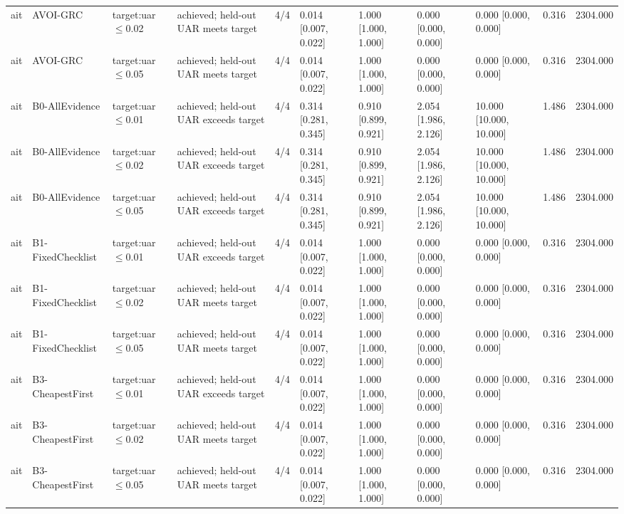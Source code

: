 \begin{table}[!ht]
{\begin{tabular}{lllllllllll}
ait & AVOI-GRC & target:uar$\le$0.02 & achieved; held-out UAR meets target & 4/4 & 0.014 [0.007, 0.022] & 1.000 [1.000, 1.000] & 0.000 [0.000, 0.000] & 0.000 [0.000, 0.000] & 0.316 & 2304.000 \\
ait & AVOI-GRC & target:uar$\le$0.05 & achieved; held-out UAR meets target & 4/4 & 0.014 [0.007, 0.022] & 1.000 [1.000, 1.000] & 0.000 [0.000, 0.000] & 0.000 [0.000, 0.000] & 0.316 & 2304.000 \\
ait & B0-AllEvidence & target:uar$\le$0.01 & achieved; held-out UAR exceeds target & 4/4 & 0.314 [0.281, 0.345] & 0.910 [0.899, 0.921] & 2.054 [1.986, 2.126] & 10.000 [10.000, 10.000] & 1.486 & 2304.000 \\
ait & B0-AllEvidence & target:uar$\le$0.02 & achieved; held-out UAR exceeds target & 4/4 & 0.314 [0.281, 0.345] & 0.910 [0.899, 0.921] & 2.054 [1.986, 2.126] & 10.000 [10.000, 10.000] & 1.486 & 2304.000 \\
ait & B0-AllEvidence & target:uar$\le$0.05 & achieved; held-out UAR exceeds target & 4/4 & 0.314 [0.281, 0.345] & 0.910 [0.899, 0.921] & 2.054 [1.986, 2.126] & 10.000 [10.000, 10.000] & 1.486 & 2304.000 \\
ait & B1-FixedChecklist & target:uar$\le$0.01 & achieved; held-out UAR exceeds target & 4/4 & 0.014 [0.007, 0.022] & 1.000 [1.000, 1.000] & 0.000 [0.000, 0.000] & 0.000 [0.000, 0.000] & 0.316 & 2304.000 \\
ait & B1-FixedChecklist & target:uar$\le$0.02 & achieved; held-out UAR meets target & 4/4 & 0.014 [0.007, 0.022] & 1.000 [1.000, 1.000] & 0.000 [0.000, 0.000] & 0.000 [0.000, 0.000] & 0.316 & 2304.000 \\
ait & B1-FixedChecklist & target:uar$\le$0.05 & achieved; held-out UAR meets target & 4/4 & 0.014 [0.007, 0.022] & 1.000 [1.000, 1.000] & 0.000 [0.000, 0.000] & 0.000 [0.000, 0.000] & 0.316 & 2304.000 \\
ait & B3-CheapestFirst & target:uar$\le$0.01 & achieved; held-out UAR exceeds target & 4/4 & 0.014 [0.007, 0.022] & 1.000 [1.000, 1.000] & 0.000 [0.000, 0.000] & 0.000 [0.000, 0.000] & 0.316 & 2304.000 \\
ait & B3-CheapestFirst & target:uar$\le$0.02 & achieved; held-out UAR meets target & 4/4 & 0.014 [0.007, 0.022] & 1.000 [1.000, 1.000] & 0.000 [0.000, 0.000] & 0.000 [0.000, 0.000] & 0.316 & 2304.000 \\
ait & B3-CheapestFirst & target:uar$\le$0.05 & achieved; held-out UAR meets target & 4/4 & 0.014 [0.007, 0.022] & 1.000 [1.000, 1.000] & 0.000 [0.000, 0.000] & 0.000 [0.000, 0.000] & 0.316 & 2304.000 \\

\end{tabular}}
\end{table}
